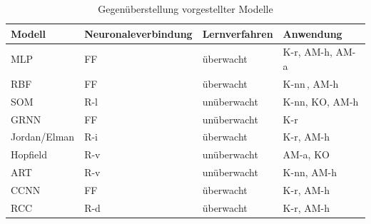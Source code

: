 \begin{table}[h]
\caption{Gegenüberstellung vorgestellter Modelle}
\label{tab:ann_modell}
\begin{tabularx}{\textwidth}{llZZ}
\toprule
Modell          &  Neuronaleverbindung   & Lernverfahren          & Anwendung           \\
\midrule
MLP             & FF        & überwacht         & K-r, AM-h, AM-a                       \\
RBF             & FF        & überwacht         & K-nn\,\protect\footnotemark{}, AM-h   \\
SOM             & R-l       & unüberwacht       & K-nn, KO, AM-h                        \\
GRNN            & FF        & unüberwacht       & K-r                                   \\
Jordan/Elman    & R-i       & überwacht         & K-r, AM-h                             \\
Hopfield        & R-v       & unüberwacht       & AM-a, KO                              \\
ART             & R-v       & unüberwacht       & K-nn, AM-h                            \\
CCNN            & FF        & überwacht         & K-r, AM-h                             \\
RCC             & R-d       & überwacht         & K-r, AM-h                             \\


\bottomrule
\end{tabularx}
\end{table}
\addtocounter{footnote}{-1}     %
\addtocounter{Hfootnote}{-1}    %
\wrapfigfoot{}


